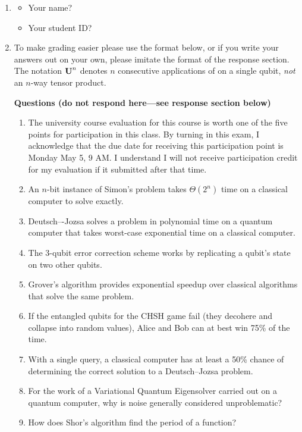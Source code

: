 \documentclass[12pt]{article}
\begin{document}
\begin{enumerate}
    \item{} \begin{itemize}
    \item Your name? \Blank[3in]{}
    \item Your student ID? \Blank[3in]{}
\end{itemize}

\item {} To make grading easier please use the format below, or if you write your answers out on your own, please imitate the format of the response section.  The notation $\mbox{\bfseries{\textrm{U}}}^{n}$ denotes $n$ consecutive applications of  on a single qubit, \emph{not} an $n$-way tensor product.

\textbf{Questions (do not respond here---see response section below)}
\begin{enumerate}[label=\theenumi.\arabic*]
   \item\label{tf:a} The university course evaluation for this course is worth one of the five points for
participation in this class. By turning in this exam, I acknowledge that the due
date for receiving this participation point is Monday May 5, 9 AM.  I understand I will not receive participation credit for my evaluation if it submitted after that time.

   \item\label{tf:d} An $n$-bit instance of Simon’s problem takes $\Theta(2^{n})$ time on a classical computer to solve exactly.
   \item\label{tf:e} Deutsch–-Jozsa solves a problem in polynomial time on a quantum computer that
takes worst-case exponential time on a classical computer.
   \item\label{tf:f} The 3-qubit error correction scheme works by replicating a qubit's state on two other qubits.
      \item\label{tf:g} Grover’s algorithm provides exponential speedup over classical algorithms that solve the same problem.
    \item\label{tf:h} If the entangled qubits for the CHSH game fail (they decohere and collapse into
random values), Alice and Bob can at best win 75\% of the time.
    \item\label{tf:i} With a single query, a classical computer has at least a 50\% chance of determining
the correct solution to a Deutsch–Jozsa problem.
    \item\label{tf:j}  For the work of a Variational Quantum Eigensolver carried out on a quantum computer, why is noise generally considered unproblematic?
       \item\label{tf:b} How does Shor's algorithm find the period of a function?
\end{enumerate}


\end{enumerate}
\end{document}
